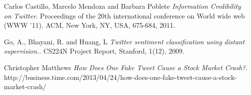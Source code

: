 \documentclass[12pt]{article}
\begin{document}
\newpage
\begin{thebibliography}{9}

Carlos Castillo, Marcelo Mendoza and Barbara Poblete
\textit{Information Credibility on Twitter}. 
Proceedings of the 20th international conference on World wide web (WWW '11). ACM, New York, NY, USA, 675-684, 2011.
 
Go, A., Bhayani, R. and Huang, L
\textit{Twitter sentiment classification using distant supervision.}.
CS224N Project Report, Stanford, 1(12), 2009.

 Christopher Matthews
\textit{How Does One Fake Tweet Cause a Stock Market Crash?}. 
http://business.time.com/2013/04/24/how-does-one-fake-tweet-cause-a-stock-market-crash/


\end{thebibliography}
\end{document}
